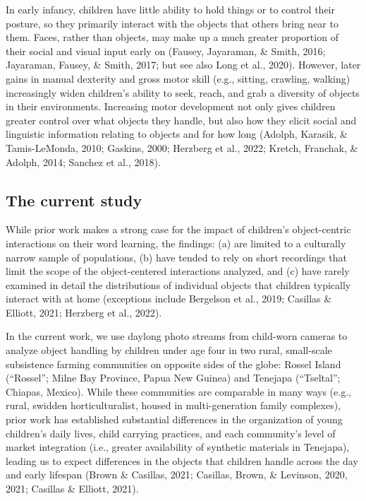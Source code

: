 \documentclass[10pt, letterpaper]{article}
\begin{document}
In early infancy, children have little ability to hold things or to
control their posture, so they primarily interact with the objects that
others bring near to them. Faces, rather than objects, may make up a
much greater proportion of their social and visual input early on
(Fausey, Jayaraman, \& Smith, 2016; Jayaraman, Fausey, \& Smith, 2017;
but see also Long et al., 2020). However, later gains in manual
dexterity and gross motor skill (e.g., sitting, crawling, walking)
increasingly widen children's ability to seek, reach, and grab a
diversity of objects in their environments. Increasing motor development
not only gives children greater control over what objects they handle,
but also how they elicit social and linguistic information relating to
objects and for how long (Adolph, Karasik, \& Tamis-LeMonda, 2010;
Gaskins, 2000; Herzberg et al., 2022; Kretch, Franchak, \& Adolph, 2014;
Sanchez et al., 2018).

\hypertarget{the-current-study}{%
\subsection{The current study}\label{the-current-study}}

While prior work makes a strong case for the impact of children's
object-centric interactions on their word learning, the findings: (a)
are limited to a culturally narrow sample of populations, (b) have
tended to rely on short recordings that limit the scope of the
object-centered interactions analyzed, and (c) have rarely examined in
detail the distributions of individual objects that children typically
interact with at home (exceptions include Bergelson et al., 2019;
Casillas \& Elliott, 2021; Herzberg et al., 2022).

In the current work, we use daylong photo streams from child-worn
cameras to analyze object handling by children under age four in two
rural, small-scale subsistence farming communities on opposite sides of
the globe: Rossel Island (``Rossel''; Milne Bay Province, Papua New
Guinea) and Tenejapa (``Tseltal''; Chiapas, Mexico). While these
communities are comparable in many ways (e.g., rural, swidden
horticulturalist, housed in multi-generation family complexes), prior
work has established substantial differences in the organization of
young children's daily lives, child carrying practices, and each
community's level of market integration (i.e., greater availability of
synthetic materials in Tenejapa), leading us to expect differences in
the objects that children handle across the day and early lifespan
(Brown \& Casillas, 2021; Casillas, Brown, \& Levinson, 2020, 2021;
Casillas \& Elliott, 2021).
\end{document}

